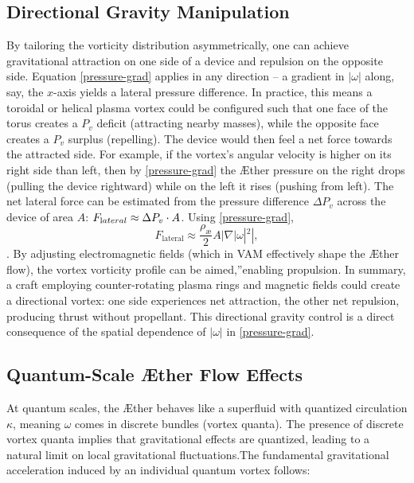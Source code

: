 \subsection*{Directional Gravity Manipulation}
By tailoring the vorticity distribution asymmetrically, one can achieve gravitational attraction on one side of a device and repulsion on the opposite side. Equation \eqref{pressure-grad} applies in any direction – a gradient in $|\omega|$ along, say, the $x$-axis yields a lateral pressure difference. In practice, this means a toroidal or helical plasma vortex could be configured such that one face of the torus creates a $P_v$ deficit (attracting nearby masses), while the opposite face creates a $P_v$ surplus (repelling). The device would then feel a net force towards the attracted side. For example, if the vortex's angular velocity is higher on its right side than left, then by \eqref{pressure-grad} the Æther pressure on the right drops (pulling the device rightward) while on the left it rises (pushing from left). The net lateral force can be estimated from the pressure difference $\Delta P_v$ across the device of area $A$: $F_{\textrm lateral}\approx \Delta P_v \cdot A$. Using \eqref{pressure-grad},
\begin{equation}
    F_\text{lateral} \approx \frac{\rho_\text{\ae}}{2} A |\nabla |\omega|^2|,
    \label{eq:lateral_force}
\end{equation}
. By adjusting electromagnetic fields (which in VAM effectively shape the Æther flow), the vortex vorticity profile can be \grqq aimed,\textquotedblright enabling propulsion. In summary, a craft employing counter-rotating plasma rings and magnetic fields could create a directional vortex: one side experiences net attraction, the other net repulsion, producing thrust without propellant. This directional gravity control is a direct consequence of the spatial dependence of $|\omega|$ in \eqref{pressure-grad}.

\subsection*{Quantum-Scale Æther Flow Effects}
At quantum scales, the Æther behaves like a superfluid with quantized circulation $\kappa$, meaning $\omega$ comes in discrete bundles (vortex quanta). The presence of discrete vortex quanta implies that gravitational effects are quantized, leading to a natural limit on local gravitational fluctuations.The fundamental gravitational acceleration induced by an individual quantum vortex follows:

